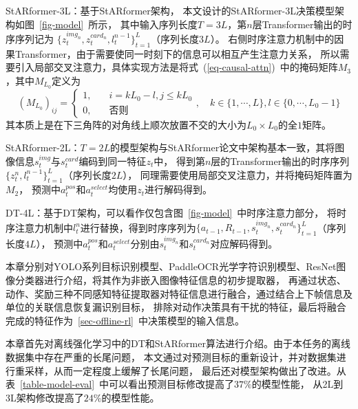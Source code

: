 StARformer-3L：基于StARformer架构，
本文设计的StARformer-3L决策模型架构如图~\ref{fig-model}~所示，
其中输入序列长度$T=3L$，第$n$层Transformer输出的时序序列记为
$\{z_t^{img_n},z_t^{card_n},l_{t}^{n-1}\}_{t=1}^{L}$（序列长度$3L$）。
右侧时序注意力机制中的因果Transformer，由于需要使同一时刻下的信息可以相互产生注意力关系，
所以需要引入局部交叉注意力，具体实现方法是将式~(\ref{eq-causal-attn})~中的掩码矩阵$M_{3}$，其中$M_{L_0}$定义为
\begin{equation}
  (M_{L_0})_{ij} = \begin{cases}
    1, &\quad i=kL_0-l,j\leqslant kL_0\\
    0, &\quad \text{否则}
  \end{cases},\quad k\in\{1,\cdots,L\}, l\in\{0,\cdots,L_0-1\}
\end{equation}
其本质上是在下三角阵的对角线上顺次放置不交的大小为$L_0\times L_0$的全$1$矩阵。

StARformer-2L：$T=2L$的模型架构与StARformer论文中架构基本一致，其将图像信息$s_{t}^{img}$与$s_{t}^{card}$编码到同一特征$z_t$中，
得到第$n$层的Transformer输出的时序序列$\{z_t^{n}, l_{t}^{n-1}\}_{t=1}^{L}$（序列长度$2L$），
同理需要使用局部交叉注意力，并将掩码矩阵置为$M_2$，
预测中$a_{t}^{pos}$和$a_{t}^{select}$均使用$z_t$进行解码得到。

DT-4L：基于DT架构，可以看作仅包含图~\ref{fig-model}~中时序注意力部分，
将时序注意力机制中$l_t^{n}$进行替换，得到时序序列为$\{a_{t-1},R_{t-1},s_{t}^{img_n}, s_{t}^{card_n}\}_{t=1}^{L}$（序列长度$4L$），
预测中$a_{t}^{pos}$和$a_{t}^{select}$分别由$s_{t}^{img_n}$和$s_{t}^{card_n}$对应解码得到。

本章分别对YOLO系列目标识别模型、PaddleOCR光学字符识别模型、ResNet图像分类器进行介绍，将其作为非嵌入图像特征信息的初步提取器，
再通过状态、动作、奖励三种不同感知特征提取器对特征信息进行融合，通过结合上下帧信息及单位的关联信息恢复漏识别目标，
排除对动作决策具有干扰的特征，最后将融合完成的特征作为~\ref{sec-offline-rl}~中决策模型的输入信息。

本章首先对离线强化学习中的DT和StARformer算法进行介绍。由于本任务的离线数据集中存在严重的长尾问题，
本文通过对预测目标的重新设计，并对数据集进行重采样，从而一定程度上缓解了长尾问题，
最后还对模型架构做出了改进。从表~\ref{table-model-eval}~中可以看出预测目标修改提高了$37\%$的模型性能，
从2L到3L架构修改提高了$24\%$的模型性能。
